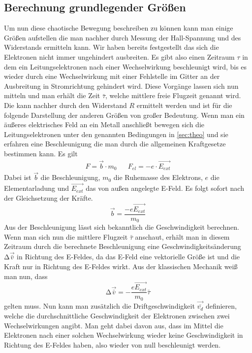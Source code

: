 \subsection{Berechnung grundlegender Größen}
Um nun diese chaotische Bewegung beschreiben zu können kann man einige Größen aufstellen die man nachher durch Messung der Hall-Spannung und des Widerstands ermitteln kann.
Wir haben bereits festgestellt das sich die Elektronen nicht immer ungehindert ausbreiten. Es gibt also einen Zeitraum $\tau$ in dem ein Leitungselektronen nach einer Wechselwirkung
beschleunigt wird, bis es wieder durch eine Wechselwirkung mit einer Fehlstelle im Gitter an der Ausbreitung in Stromrichtung gehindert wird.
Diese Vorgänge lassen sich nun mitteln und man erhält die Zeit $\bar{\tau}$, welche mittlere freie Flugzeit genannt wird.
Die kann nachher durch den Widerstand $R$ %
ermittelt werden und ist für die folgende Darstellung der anderen Größen von großer Bedeutung.
Wenn man ein äußeres elektrisches Feld an ein Metall anschließt bewegen sich die Leitungselektronen unter den genannten Bedingungen in \ref{sec:theo} und sie erfahren eine Beschleunigung
die man durch die allgemeinen Kraftgesetze bestimmen kann. Es gilt
\begin{align}
\nonumber
F = \vec{b} \cdot m_{0} && F_{el} = -e \cdot \vec{E_{ext}}
\end{align}
Dabei ist $\vec{b}$ die Beschleunigung, $m_{0}$ die Ruhemasse des Elektrons, $e$ die Elementarladung und $\vec{E_{ext}}$ das von außen angelegte E-Feld.
Es folgt sofort nach der Gleichsetzung der Kräfte.
\begin{equation}
\vec{b} = \frac{-e \vec{E_{ext}}}{m_{0}}
\end{equation}
Aus der Beschleunigung lässt sich bekanntlich die Geschwindigkeit berechnen. Wenn man sich nun die mittlere Flugzeit $\bar{\tau}$ anschaut, erhält man in diesem Zeitraum durch die
berechnete Beschleunigung eine Geschwindigkeitsänderung $\increment \vec{\bar{v}}$ in Richtung des E-Feldes, da das E-Feld eine vektorielle Größe ist und die Kraft nur in Richtung des E-Feldes wirkt.
Aus der klassischen Mechanik weiß man nun, dass
\begin{equation}
\label{eqn:deltav}
\increment \vec{\bar{v}} = - \frac{e\vec{E_{ext}}}{m_{0}} \bar{\tau}
\end{equation}
gelten muss. Nun kann man zusätzlich die Driftgeschwindigkeit $\vec{\bar{v_{d}}}$ definieren, welche die durchschnittliche Geschwindigkeit der Elektronen zwischen zwei Wechselwirkungen
angibt. Man geht dabei davon aus, dass im Mittel die Elektronen nach einer solchen Wechselwirkung wieder keine Geschwindigkeit in Richtung des E-Feldes haben, also wieder von null beschleunigt werden.
